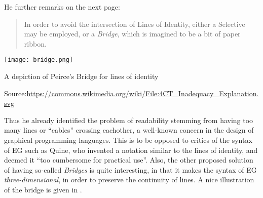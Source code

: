He further remarks on the next page:
\begin{quote}
  In order to avoid the intersection of Lines of Identity, either a Selective
may be employed, or a \emph{Bridge}, which is imagined to be a bit of paper
ribbon.
\end{quote}

\begin{marginfigure}
  \texttt{[image: bridge.png]}
  \caption{A depiction of Peirce's Bridge for lines of identity}
  \footnotesize Source:\hspace{3pt}\url{https://commons.wikimedia.org/wiki/File:4CT_Inadequacy_Explanation.svg}
\end{marginfigure}

Thus he already identified the problem of readability stemming from having too
many lines or ``cables'' crossing eachother, a well-known concern in the design
of graphical programming languages. This is to be opposed
to critics of the syntax of EG such as Quine, who invented a notation similar to
the lines of identity, and deemed it ``too cumbersome for practical
use''. Also, the other proposed solution of having
so-called \emph{Bridges} is quite interesting, in that it makes the syntax of EG
\emph{three-dimensional}, in order to preserve the continuity of lines. A nice
illustration of the bridge is given in .